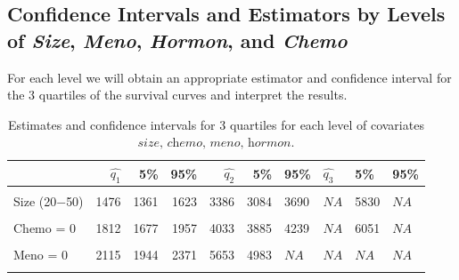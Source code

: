\documentclass[
]{article}
\begin{document}
\subsection{Confidence Intervals and Estimators by Levels of \textit{Size}, \textit{Meno}, \textit{Hormon}, and \textit{Chemo}}

For each level we will obtain an appropriate estimator and confidence interval for the 3 quartiles of the survival curves and interpret the results.

\begin{table}[!h]

\caption{\label{tab:quantiles-chemo}Estimates and confidence intervals for 3 quartiles for each level of covariates $\textit{size, chemo, meno, hormon}$.}
\centering
\fontsize{10}{12}\selectfont
\begin{tabular}[t]{lrrrrrllll}
\toprule
  & $\hat{q_1}$ & 5\% & 95\% & $\hat{q_2}$ & 5\% & 95\% & $\hat{q_3}$ & 5\% & 95\%\\
\midrule
\cellcolor{gray!6}{Size ($\leq$20)} & \cellcolor{gray!6}{2880} & \cellcolor{gray!6}{2590} & \cellcolor{gray!6}{3315} & \cellcolor{gray!6}{5653} & \cellcolor{gray!6}{4983} & \cellcolor{gray!6}{$\textit{NA}$} & \cellcolor{gray!6}{$\textit{NA}$} & \cellcolor{gray!6}{6051} & \cellcolor{gray!6}{$\textit{NA}$}\\
Size (20$-$50) & 1476 & 1361 & 1623 & 3386 & 3084 & 3690 & $\textit{NA}$ & 5830 & $\textit{NA}$\\
\cellcolor{gray!6}{Size ($>$50)} & \cellcolor{gray!6}{890} & \cellcolor{gray!6}{809} & \cellcolor{gray!6}{999} & \cellcolor{gray!6}{1909} & \cellcolor{gray!6}{1566} & \cellcolor{gray!6}{2141} & \cellcolor{gray!6}{3714} & \cellcolor{gray!6}{3240} & \cellcolor{gray!6}{4309}\\
Chemo = 0 & 1812 & 1677 & 1957 & 4033 & 3885 & 4239 & $\textit{NA}$ & 6051 & $\textit{NA}$\\
\cellcolor{gray!6}{Chemo = 1} & \cellcolor{gray!6}{1699} & \cellcolor{gray!6}{1455} & \cellcolor{gray!6}{1954} & \cellcolor{gray!6}{3990} & \cellcolor{gray!6}{3522} & \cellcolor{gray!6}{5291} & \cellcolor{gray!6}{$\textit{NA}$} & \cellcolor{gray!6}{5845} & \cellcolor{gray!6}{$\textit{NA}$}\\
\addlinespace
Meno = 0 & 2115 & 1944 & 2371 & 5653 & 4983 & $\textit{NA}$ & $\textit{NA}$ & $\textit{NA}$ & $\textit{NA}$\\
\cellcolor{gray!6}{Meno = 1} & \cellcolor{gray!6}{1571} & \cellcolor{gray!6}{1424} & \cellcolor{gray!6}{1723} & \cellcolor{gray!6}{3632} & \cellcolor{gray!6}{3368} & \cellcolor{gray!6}{3813} & \cellcolor{gray!6}{5762} & \cellcolor{gray!6}{5266} & \cellcolor{gray!6}{$\textit{NA}$}\\

\end{tabular}
\end{table}
\end{document}
